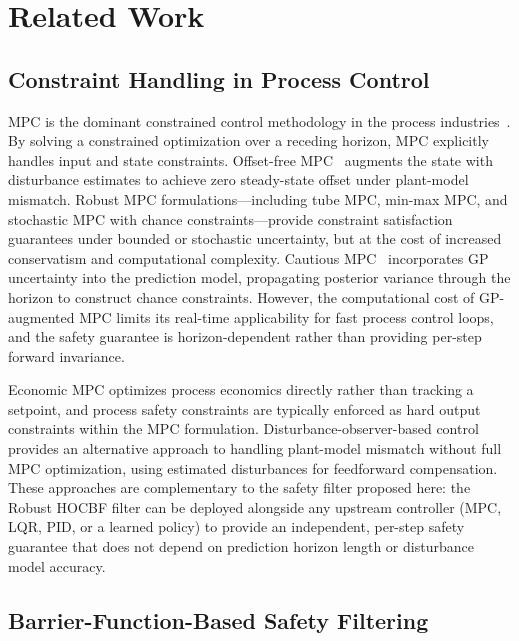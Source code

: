 \section{Related Work}
\label{sec:related}

\subsection{Constraint Handling in Process Control}

MPC is the dominant constrained control methodology in the process industries~\cite{qin2003survey,mayne2000constrained}. By solving a constrained optimization over a receding horizon, MPC explicitly handles input and state constraints. Offset-free MPC~\cite{morari1999model} augments the state with disturbance estimates to achieve zero steady-state offset under plant-model mismatch. Robust MPC formulations---including tube MPC, min-max MPC, and stochastic MPC with chance constraints---provide constraint satisfaction guarantees under bounded or stochastic uncertainty, but at the cost of increased conservatism and computational complexity. Cautious MPC~\cite{hewing2020cautious} incorporates GP uncertainty into the prediction model, propagating posterior variance through the horizon to construct chance constraints. However, the computational cost of GP-augmented MPC limits its real-time applicability for fast process control loops, and the safety guarantee is horizon-dependent rather than providing per-step forward invariance.

Economic MPC optimizes process economics directly rather than tracking a setpoint, and process safety constraints are typically enforced as hard output constraints within the MPC formulation. Disturbance-observer-based control provides an alternative approach to handling plant-model mismatch without full MPC optimization, using estimated disturbances for feedforward compensation. These approaches are complementary to the safety filter proposed here: the Robust HOCBF filter can be deployed alongside any upstream controller (MPC, LQR, PID, or a learned policy) to provide an independent, per-step safety guarantee that does not depend on prediction horizon length or disturbance model accuracy.

\subsection{Barrier-Function-Based Safety Filtering}

